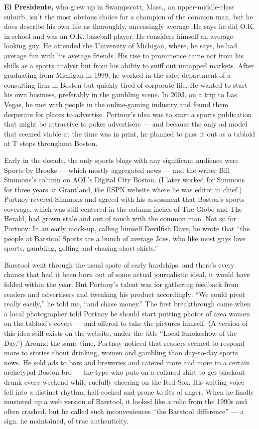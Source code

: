 \textbf{El Presidente,} who grew up in Swampscott, Mass., an
upper-middle-class suburb, isn't the most obvious choice for a champion
of the common man, but he does describe his own life as thoroughly,
unceasingly average. He says he did O.K. in school and was an O.K.
baseball player. He considers himself an average-looking guy. He
attended the University of Michigan, where, he says, he had average fun
with his average friends. His rise to prominence came not from his
skills as a sports analyst but from his ability to sniff out untapped
markets. After graduating from Michigan in 1999, he worked in the sales
department of a consulting firm in Boston but quickly tired of corporate
life. He wanted to start his own business, preferably in the gambling
scene. In 2003, on a trip to Las Vegas, he met with people in the
online-gaming industry and found them desperate for places to advertise.
Portnoy's idea was to start a sports publication that might be
attractive to poker advertisers --- and because the only ad model that
seemed viable at the time was in print, he planned to pass it out as a
tabloid at T stops throughout Boston.

Early in the decade, the only sports blogs with any significant audience
were Sports by Brooks --- which mostly aggregated news --- and the
writer Bill Simmons's column on AOL's Digital City Boston. (I later
worked for Simmons for three years at Grantland, the ESPN website where
he was editor in chief.) Portnoy revered Simmons and agreed with his
assessment that Boston's sports coverage, which was still centered in
the column inches of The Globe and The Herald, had grown stale and out
of touch with the common man. Not so for Portnoy: In an early mock-up,
calling himself Devilfish Dave, he wrote that ``the people at Barstool
Sports are a bunch of average Joes, who like most guys love sports,
gambling, golfing and chasing short skirts.''

Barstool went through the usual spate of early hardships, and there's
every chance that had it been born out of some actual journalistic
ideal, it would have folded within the year. But Portnoy's talent was
for gathering feedback from readers and advertisers and tweaking his
product accordingly: ``We could pivot really easily,'' he told me, ``and
chase money.'' The first breakthrough came when a local photographer
told Portnoy he should start putting photos of area women on the
tabloid's covers --- and offered to take the pictures himself. (A
version of this idea still exists on the website, under the title
``Local Smokeshow of the Day.'') Around the same time, Portnoy noticed
that readers seemed to respond more to stories about drinking, women and
gambling than day-to-day sports news. He sold ads to bars and breweries
and catered more and more to a certain archetypal Boston bro --- the
type who puts on a collared shirt to get blackout drunk every weekend
while ruefully cheering on the Red Sox. His writing voice fell into a
distinct rhythm, half-cocked and prone to fits of anger. When he finally
mustered up a web version of Barstool, it looked like a relic from the
1990s and often crashed, but he called such inconveniences ``the
Barstool difference'' --- a sign, he maintained, of true authenticity.

